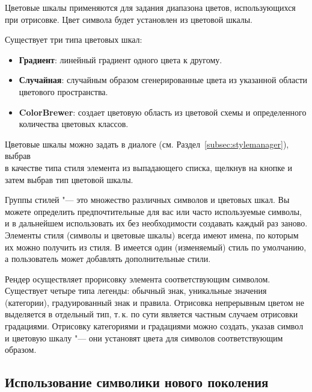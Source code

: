 
Цветовые шкалы применяются для задания диапазона цветов,
использующихся при отрисовке. Цвет символа будет установлен
из цветовой шкалы.

Существует три типа цветовых шкал:

\begin{itemize}[label=--]
\item \textbf{Градиент}: линейный градиент одного цвета к другому.
\item \textbf{Случайная}: случайным образом сгенерированные цвета из
указанной области цветового пространства.
\item \textbf{ColorBrewer}: создает цветовую область из цветовой схемы и
определенного количества цветовых классов.
\end{itemize}

Цветовые шкалы можно задать в диалоге 
(см. Раздел~\ref{subsec:stylemanager}), выбрав \\
 в качестве типа стиля
 элемента из выпадающего списка, щелкнув на кнопке 
 и затем выбрав тип цветовой шкалы.


Группы стилей "--- это множество различных символов и цветовых шкал. Вы
можете определить предпочтительные для вас или часто используемые символы,
и в дальнейшем использовать их без необходимости создавать каждый раз заново.
Элементы стиля (символы и цветовые шкалы) всегда имеют имена, по которым
их можно получить из стиля. В \qg имеется один (изменяемый) стиль по
умолчанию, а пользователь может добавлять дополнительные стили.


Рендер осуществляет прорисовку элемента соответствующим символом.
Существует четыре типа легенды: обычный знак, уникальные значения (категории),
градуированный знак и правила. Отрисовка непрерывным цветом не выделяется
в отдельный тип, т.\,к. по сути является частным случаем отрисовки градациями.
Отрисовку категориями и градациями можно создать, указав символ и цветовую
шкалу "--- они установят цвета для символов соответствующим образом.

\subsection{Использование символики нового поколения}\label{new_generation_sym}

